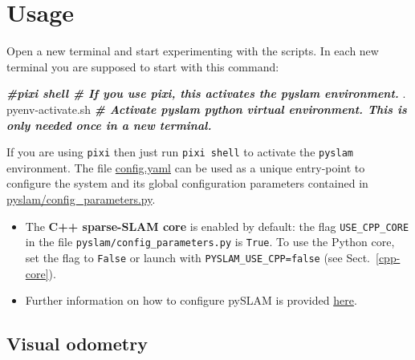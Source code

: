 \documentclass{article}
\newenvironment{Shaded}{\begin{snugshade}}{\end{snugshade}}
\newcommand{\BuiltInTok}[1]{\textcolor[rgb]{0.74,0.68,0.62}{#1}}
\newcommand{\CommentTok}[1]{\textcolor[rgb]{0.00,0.40,1.00}{\textbf{\textit{#1}}}}
\newcommand{\ExtensionTok}[1]{\textcolor[rgb]{0.74,0.68,0.62}{#1}}
\newcommand{\NormalTok}[1]{\textcolor[rgb]{0.74,0.68,0.62}{#1}}
\begin{document}





\clearpage
\appendix

\hypertarget{usage}{%
\section{Usage}\label{usage}}

Open a new terminal and start experimenting with the scripts. In each
new terminal you are supposed to start with this command:

\begin{scriptsize}
\begin{Shaded}
\begin{Highlighting}[]
\CommentTok{#pixi shell           # If you use pixi, this activates the pyslam environment. }
\NormalTok{ }\BuiltInTok{.} \ExtensionTok{pyenv-activate.sh}   \CommentTok{#  Activate pyslam python virtual environment. This is only needed once in a new terminal.}
\end{Highlighting}
\end{Shaded}
\end{scriptsize}

If you are using \texttt{pixi} then just run \texttt{pixi\ shell} to
activate the \texttt{pyslam} environment. The file \href{https://github.com/luigifreda/pyslam/blob/master/config.yaml}{config.yaml} can be used as a unique
entry-point to configure the system and its global configuration
parameters contained in
\href{https://github.com/luigifreda/pyslam/blob/master/pyslam/config_parameters.py}{pyslam/config\_parameters.py}. 
\begin{itemize}
\item The \textbf{C++ sparse-SLAM core} is enabled by default: the flag \texttt{USE\_CPP\_CORE} in the file \texttt{pyslam/config\_parameters.py} is \texttt{True}. To use the Python core, set the flag to \texttt{False} or launch with \texttt{PYSLAM\_USE\_CPP=false} (see Sect.~\ref{cpp-core}).
\item Further information on how to configure pySLAM is provided \protect\hyperlink{selecting-a-dataset-and-different-configuration-parameters}{here}.
\end{itemize}


\hypertarget{visual-odometry}{%
\subsection{Visual odometry}\label{visual-odometry}}
\end{document}
